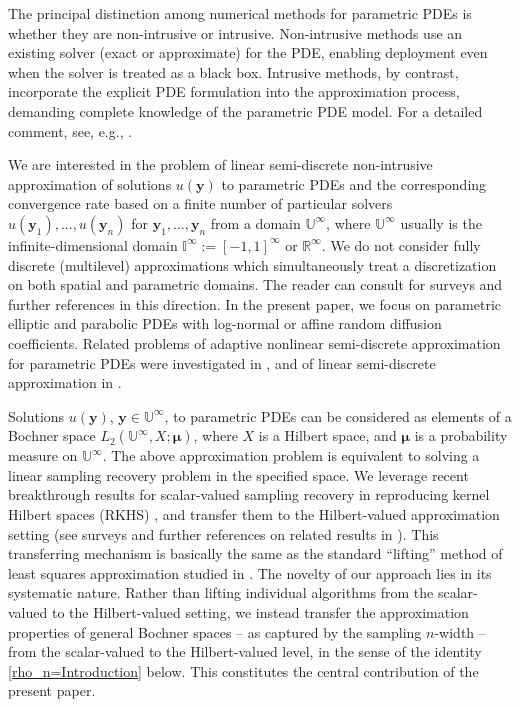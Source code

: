 \documentclass[11pt]{article}
\numberwithin{equation}{section}
\theoremstyle{definition}
\theoremstyle{remark}
\newcommand{\by}{{\boldsymbol{y}}}
\newcommand{\bmu}{{\boldsymbol{\mu}}}
\def\IIi{{\mathbb I}^\infty}
\def\RRi{{\mathbb R}^\infty}
\def\UUi{{\mathbb U}^{\infty}}
\begin{document}
{The principal distinction among numerical methods for parametric PDEs is whether they are non-intrusive or intrusive. Non-intrusive methods use an existing solver (exact or approximate) for the PDE, enabling deployment even when the solver is treated as a black box. Intrusive methods, by contrast, incorporate the explicit PDE formulation into the approximation process, demanding complete knowledge of the parametric PDE model.
For a detailed comment, see, e.g., \cite[Section 1.6]{CoDe15a}.}

We are interested in the problem of linear semi-discrete {non-intrusive} approximation of solutions $u(\by)$ to parametric PDEs and the corresponding convergence rate based on a finite number of particular solvers $u(\by_1),..., u(\by_n)$ for $\by_1,..., \by_n$ from a domain $\UUi$, where $\UUi$  usually is the infinite-dimensional domain $\IIi := [-1,1]^\infty$ or $\RRi$.
We do not consider fully discrete {(multilevel)  approximations} which simultaneously treat a discretization on both spatial and parametric domains.
The reader can consult \cite{Dung21,DNSZ2023} for surveys and further references in this direction.
In the present paper, we focus on parametric elliptic and parabolic PDEs with log-normal or affine random diffusion coefficients.
Related problems of adaptive nonlinear semi-discrete  approximation for parametric PDEs were investigated in \cite{CCS15,CoDe15a,ABDM2024,CCMNT2015,CCS13}, and of linear semi-discrete  approximation in 
\cite{ADM2024,BNT2007,Dung19,Dung21,DD-Erratum23, EST18,MNST2014,NTW2008,NTW2008a,DNSZ2023,ZDS19,ZS20}.

Solutions $u(\by)$, $\by \in \UUi$, to parametric PDEs can be considered as elements of a Bochner space $L_2(\UUi,X;\bmu)$, where
$X$ is a Hilbert space,  and $\bmu$ is a probability measure on $\UUi$. The above approximation problem is equivalent to solving a linear sampling recovery problem in the specified space.
We leverage recent breakthrough results for scalar-valued sampling recovery in reproducing kernel Hilbert spaces (RKHS) \cite{BSU23, DKU2023, KUV21, KU21a}, and transfer them to the Hilbert-valued approximation setting (see surveys and further references on related results in \cite{DTU18B, SU2023}). 
This transferring mechanism  is basically the same as the standard  “lifting” method
  of least squares approximation studied in 
\cite{ABDM2023,ABDM2024,ADM2024, CCMNT2015, CM2018}. The novelty of our approach lies in its systematic nature. Rather than lifting individual algorithms from the scalar-valued to the Hilbert-valued setting, we instead transfer the approximation properties of general Bochner spaces -- as captured by the sampling 
$n$-width -- from the scalar-valued to the Hilbert-valued level, in the sense of the identity \eqref{rho_n=Introduction} below. This constitutes the central contribution of the present paper.
\end{document}
